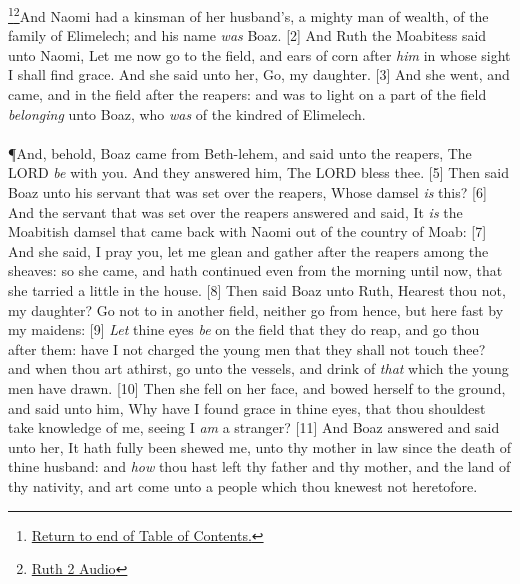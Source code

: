 \footnote{\textcolor[cmyk]{0.99998,1,0,0}{\hyperlink{TOC}{Return to end of Table of Contents.}}}\footnote{\href{https://audiobible.com/bible/ruth_2.html}{\textcolor[cmyk]{0.99998,1,0,0}{Ruth 2 Audio}}}\textcolor[cmyk]{0.99998,1,0,0}{And Naomi had a kinsman of her husband's, a mighty man of wealth, of the family of Elimelech; and his name \emph{was} Boaz.}
[2] \textcolor[cmyk]{0.99998,1,0,0}{And Ruth the Moabitess said unto Naomi, Let me now go to the field, and  ears of corn after \emph{him} in whose sight I shall find grace. And she said unto her, Go, my daughter.}
[3] \textcolor[cmyk]{0.99998,1,0,0}{And she went, and came, and  in the field after the reapers: and  was to light on a part of the field \emph{belonging} unto Boaz, who \emph{was} of the kindred of Elimelech.}\\
\\
\P \textcolor[cmyk]{0.99998,1,0,0}{And, behold, Boaz came from Beth-lehem, and said unto the reapers, The LORD \emph{be} with you. And they answered him, The LORD bless thee.}
[5] \textcolor[cmyk]{0.99998,1,0,0}{Then said Boaz unto his servant that was set over the reapers, Whose damsel \emph{is} this?}
[6] \textcolor[cmyk]{0.99998,1,0,0}{And the servant that was set over the reapers answered and said, It \emph{is} the Moabitish damsel that came back with Naomi out of the country of Moab:}
[7] \textcolor[cmyk]{0.99998,1,0,0}{And she said, I pray you, let me glean and gather after the reapers among the sheaves: so she came, and hath continued even from the morning until now, that she tarried a little in the house.}
[8] \textcolor[cmyk]{0.99998,1,0,0}{Then said Boaz unto Ruth, Hearest thou not, my daughter? Go not to  in another field, neither go from hence, but  here fast by my maidens:}
[9] \textcolor[cmyk]{0.99998,1,0,0}{\emph{Let} thine eyes \emph{be} on the field that they do reap, and go thou after them: have I not charged the young men that they shall not touch thee? and when thou art athirst, go unto the vessels, and drink of \emph{that} which the young men have drawn.}
[10] \textcolor[cmyk]{0.99998,1,0,0}{Then she fell on her face, and bowed herself to the ground, and said unto him, Why have I found grace in thine eyes, that thou shouldest take knowledge of me, seeing I \emph{am} a stranger?}
[11] \textcolor[cmyk]{0.99998,1,0,0}{And Boaz answered and said unto her, It hath fully been shewed me,  unto thy mother in law since the death of thine husband: and \emph{how} thou hast left thy father and thy mother, and the land of thy nativity, and art come unto a people which thou knewest not heretofore.}
